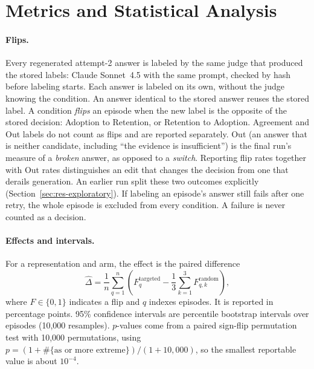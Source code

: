 \section{Metrics and Statistical Analysis}
\label{sec:metrics}

\paragraph{Flips.} Every regenerated attempt-2 answer is labeled by the same
judge that produced the stored labels: Claude Sonnet~4.5 with the same
prompt, checked by hash before labeling starts. Each answer is labeled on its
own, without the judge knowing the condition. An answer identical to the
stored answer reuses the stored label. A condition \emph{flips} an episode
when the new label is the opposite of the stored decision: Adoption to
Retention, or Retention to Adoption. Agreement and Out labels do not count as
flips and are reported separately. Out (an answer that is neither candidate,
including ``the evidence is insufficient'') is the final run's measure of a
\emph{broken} answer, as opposed to a \emph{switch}. Reporting flip rates
together with Out rates distinguishes an edit that changes the decision from
one that derails generation. An earlier run split these two outcomes
explicitly (Section~\ref{sec:res-exploratory}). If labeling an episode's
answer still fails after one retry, the whole episode is excluded from every
condition. A failure is never counted as a decision.

\paragraph{Effects and intervals.} For a representation and arm, the effect
is the paired difference
\begin{equation}
    \hat\Delta = \frac{1}{n}\sum_{q=1}^{n}
    \left(F_q^{\mathrm{targeted}} - \frac{1}{3}\sum_{k=1}^{3}F_{q,k}^{\mathrm{random}}\right),
\end{equation}
where $F\in\{0,1\}$ indicates a flip and $q$ indexes episodes. It is reported
in percentage points. 95\% confidence intervals are percentile bootstrap
intervals over episodes (10,000 resamples). $p$-values come from a paired
sign-flip permutation test with 10,000 permutations, using
$p=(1+\#\{\text{as or more extreme}\})/(1+10{,}000)$, so the smallest
reportable value is about $10^{-4}$.


